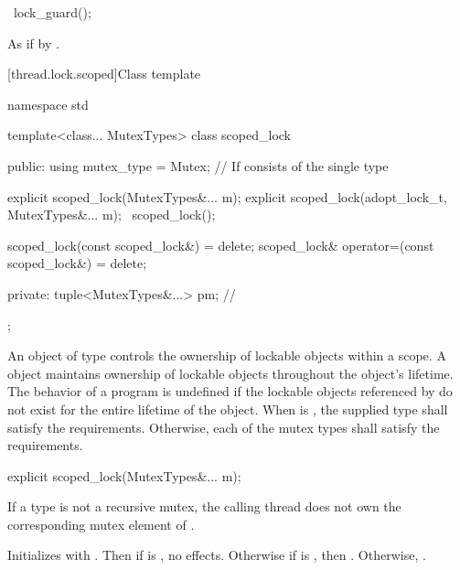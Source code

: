 %
\begin{itemdecl}
~lock_guard();
\end{itemdecl}

\begin{itemdescr}
\pnum
\effects As if by .
\end{itemdescr}


[thread.lock.scoped]{Class template }

%
\begin{codeblock}
namespace std {
  template<class... MutexTypes>
  class scoped_lock {
  public:
    using mutex_type = Mutex;   // If  consists of the single type 

    explicit scoped_lock(MutexTypes&... m);
    explicit scoped_lock(adopt_lock_t, MutexTypes&... m);
    ~scoped_lock();

    scoped_lock(const scoped_lock&) = delete;
    scoped_lock& operator=(const scoped_lock&) = delete;

  private:
    tuple<MutexTypes&...> pm;   // \expos
  };
}
\end{codeblock}

\pnum
An object of type  controls the ownership of lockable objects
within a scope. A  object maintains ownership of lockable
objects throughout the  object's lifetime.
The behavior of a program is undefined if the lockable objects referenced by
 do not exist for the entire lifetime of the 
object.
When  is ,
the supplied  type
shall satisfy the  requirements.
Otherwise, each of the mutex types
shall satisfy the  requirements.

%
\begin{itemdecl}
explicit scoped_lock(MutexTypes&... m);
\end{itemdecl}

\begin{itemdescr}
\pnum
\requires If a  type is not a recursive mutex,
the calling thread does not own the corresponding mutex element of .

\pnum
\effects Initializes  with .
Then if  is , no effects.
Otherwise if  is , then .
Otherwise, .
\end{itemdescr}

